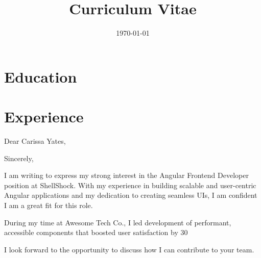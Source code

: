 \documentclass[11pt,a4paper,sans]{moderncv}
\title{Curriculum Vitae}  %
\begin{document}
\makecvtitle
\section{Education}
\section{Experience}

\clearpage

\date{\today}
\opening{Dear Carissa Yates,}
\closing{Sincerely,}
\makelettertitle

\usepackage{ragged2e}
\justifying

I am writing to express my strong interest in the Angular Frontend Developer position at ShellShock. With my experience in building scalable and user-centric Angular applications and my dedication to creating seamless UIs, I am confident I am a great fit for this role.

During my time at Awesome Tech Co., I led development of performant, accessible components that boosted user satisfaction by 30%

I look forward to the opportunity to discuss how I can contribute to your team.

\makeletterclosing
\end{document}
